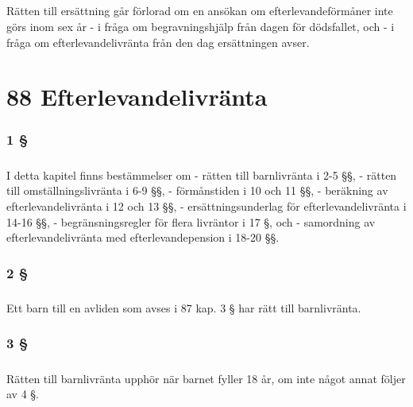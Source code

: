 \documentclass[a4paper,notitlepage,openany,10pt]{book}
\begin{document}
\paragraph*{}
Rätten till ersättning går förlorad om en ansökan om efterlevandeförmåner inte görs inom sex år
\newline - i fråga om begravningshjälp från dagen för dödsfallet, och
\newline - i fråga om efterlevandelivränta från den dag ersättningen avser.
\chapter*{88 Efterlevandelivränta}
\subsection*{1 §}
\paragraph*{}
I detta kapitel finns bestämmelser om
\newline - rätten till barnlivränta i 2-5 §§,
\newline - rätten till omställningslivränta i 6-9 §§,
\newline - förmånstiden i 10 och 11 §§,
\newline - beräkning av efterlevandelivränta i 12 och 13 §§,
\newline - ersättningsunderlag för efterlevandelivränta i 14-16 §§,
\newline - begränsningsregler för flera livräntor i 17 §, och
\newline - samordning av efterlevandelivränta med efterlevandepension i 18-20 §§.
\subsection*{2 §}
\paragraph*{}
Ett barn till en avliden som avses i 87 kap. 3 § har rätt till barnlivränta.
\subsection*{3 §}
\paragraph*{}
Rätten till barnlivränta upphör när barnet fyller 18 år, om inte något annat följer av 4 §.
\end{document}
